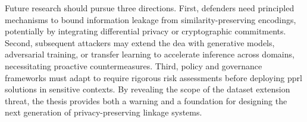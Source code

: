 \documentclass[a4paper,11pt]{scrartcl}
\begin{document}
Future research should pursue three directions. First, defenders need principled mechanisms to bound information leakage from similarity-preserving encodings, potentially by integrating differential privacy or cryptographic commitments. Second, subsequent attackers may extend the \ac{dea} with generative models, adversarial training, or transfer learning to accelerate inference across domains, necessitating proactive countermeasures. Third, policy and governance frameworks must adapt to require rigorous risk assessments before deploying \ac{pprl} solutions in sensitive contexts. By revealing the scope of the dataset extension threat, the thesis provides both a warning and a foundation for designing the next generation of privacy-preserving linkage systems.
\end{document}
